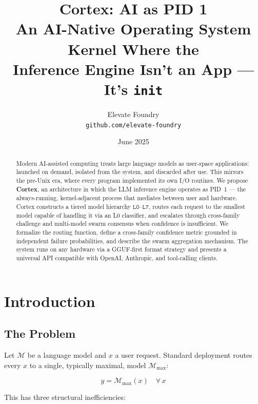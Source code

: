 \documentclass[11pt, a4paper, twocolumn]{article}
\title{
    \vspace{-1.5em}
    \textbf{Cortex: AI as PID 1} \\[0.5em]
    \large An AI-Native Operating System Kernel Where the \\
    Inference Engine Isn't an App --- It's \texttt{init}
}
\author{
    Elevate Foundry \\
    \texttt{github.com/elevate-foundry}
}
\date{June 2025}
\newcommand{\tier}[1]{\texttt{L#1}}
\newcommand{\model}{\mathcal{M}}
\begin{document}
\maketitle
\thispagestyle{fancy}

\begin{abstract}
Modern AI-assisted computing treats large language models as user-space applications: launched on demand, isolated from the system, and discarded after use. This mirrors the pre-Unix era, where every program implemented its own I/O routines. We propose \textbf{Cortex}, an architecture in which the LLM inference engine operates as PID~1 --- the always-running, kernel-adjacent process that mediates between user and hardware. Cortex constructs a tiered model hierarchy $\tier{0}$--$\tier{7}$, routes each request to the smallest model capable of handling it via an L0 classifier, and escalates through cross-family challenge and multi-model swarm consensus when confidence is insufficient. We formalize the routing function, define a cross-family confidence metric grounded in independent failure probabilities, and describe the swarm aggregation mechanism. The system runs on any hardware via a GGUF-first format strategy and presents a universal API compatible with OpenAI, Anthropic, and tool-calling clients.
\end{abstract}

\section{Introduction}

\subsection{The Problem}

Let $\model$ be a language model and $x$ a user request. Standard deployment routes every $x$ to a single, typically maximal, model $\model_{\max}$:

\begin{equation}
    y = \model_{\max}(x) \quad \forall\, x
\end{equation}

This has three structural inefficiencies:
\end{document}
